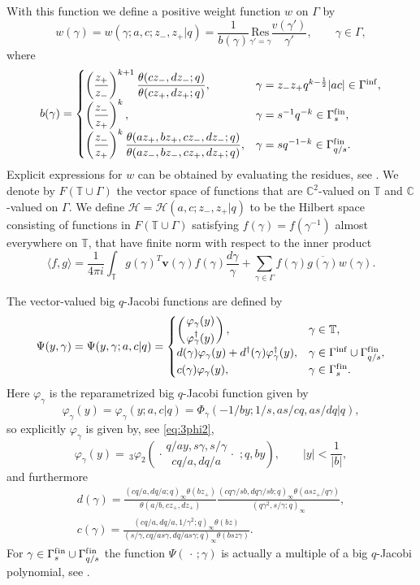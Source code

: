\documentclass[pdftex]{sigma}
\numberwithin{equation}{section}
\numberwithin{theorem}{section}
\numberwithin{proposition}{section}
\numberwithin{lemma}{section}
\numberwithin{corollary}{section}
\numberwithin{definition}{section}
\numberwithin{example}{section}
\numberwithin{remark}{section}
\numberwithin{note}{section}
\newcommand{\C}{\mathbb C}
\newcommand{\T}{\mathbb T}
\newcommand{\rphis}[5]{\,_{#1}\varphi_{#2} \left( \genfrac{.}{.}{0pt}{}{#3}{#4}
\ ;#5 \right)}
\newcommand{\Res}[1]{\underset{#1}{\mathrm{Res}}}
\newcommand{\vect}[2]{\left( \genfrac{.}{.}{0pt}{}{#1}{#2} \right) }
\begin{document}
With this function we def\/ine a positive weight function $w$ on $\Gamma$ by
\[
w(\gamma)=w(\gamma;a,c;z_-,z_+|q) = \frac1{b(\gamma)}\Res{\gamma'=\gamma} \frac{v(\gamma')}{\gamma'},\qquad \gamma \in \Gamma,
\]
where
\[
b(\gamma)=
\begin{cases}
\left(\dfrac{z_+}{z_-}\right)^{k+1}\dfrac{\theta(cz_-,dz_-;q)}{\theta(cz_+,dz_+;q)}, &\gamma =z_-z_+q^{k-\frac12}|ac| \in \Gamma^{\mathrm{inf}},\\
\left(\dfrac{z_-}{z_+}\right)^k ,& \gamma = s^{-1}q^{-k} \in \Gamma^{\mathrm{f\/in}}_s,\\
\left( \dfrac{z_-}{z_+} \right)^k \dfrac{ \theta(az_+, bz_+, cz_-, dz_-;q) }{ \theta(az_-, bz_-, cz_+, dz_+;q) }, &\gamma = sq^{-1-k} \in \Gamma^{\mathrm{f\/in}}_{q/s}.
\end{cases}
\]
Explicit expressions for $w$ can be obtained by evaluating the residues, see \cite[Section~4]{Gr09}.
We denote by $F(\T\cup \Gamma)$ the vector space of functions that are $\C^2$-valued on $\T$ and $\C$-valued on $\Gamma$. We def\/ine $\mathcal H=\mathcal H(a,c;z_-,z_+|q)$ to be the Hilbert space consisting of functions in $F(\T\cup\Gamma)$ satisfying $f(\gamma)=f(\gamma^{-1})$ almost everywhere on $\T$, that have f\/inite norm with respect to the inner product
\[
\langle f,g \rangle = \frac{ 1}{4\pi i } \int_\T g(\gamma)^T
\mathbf v(\gamma) f(\gamma) \frac{ d\gamma}{\gamma} + \sum_{\gamma \in \Gamma}  f(\gamma) \overline{g(\gamma)} w(\gamma).
\]

The vector-valued big $q$-Jacobi functions are def\/ined by
\begin{gather*} %
\Psi(y,\gamma) = \Psi(y,\gamma;a,c|q)=
\begin{cases}
\displaystyle \vect{\varphi_\gamma(y)}{\varphi_\gamma^\dagger(y)}, & \gamma \in \T,\\
d(\gamma) \varphi_\gamma(y)+d^\dagger(\gamma) \varphi_\gamma^\dagger(y), & \gamma \in \Gamma^{\mathrm{inf}} \cup \Gamma^{\mathrm{f\/in}}_{q/s},\\
c(\gamma) \varphi_\gamma(y), & \gamma \in \Gamma_s^{\mathrm{f\/in}}.
\end{cases}
\end{gather*}
Here $\varphi_\gamma$ is the reparametrized big $q$-Jacobi function given by
\[
\varphi_\gamma(y) = \varphi_\gamma(y;a,c|q) = \Phi_\gamma(-1/by; 1/s, as/cq, as/dq|q),
\]
so explicitly $\varphi_\gamma$ is given by, see \eqref{eq:3phi2},
\[
\varphi_\gamma(y) = \rphis{3}{2}{q/ay, s\gamma, s/\gamma}{cq/a, dq/a}{q,by}, \qquad |y| <  \frac{1}{|b|},
\]
and furthermore
\begin{gather*}
d(\gamma) = \frac{  (cq/a, dq/a;q)_\infty \theta(bz_+) }{  \theta(a/b,cz_+,dz_+) }   \frac{ (cq\gamma/sb, dq\gamma/sb;q)_\infty \theta(asz_+/q\gamma) }{ (q\gamma^2,s/\gamma;q)_\infty},\\
c(\gamma) = \frac{ (cq/a, dq/a, 1/\gamma^2;q)_\infty \theta(bz) }{ (s/\gamma, cq/as\gamma, dq/as\gamma;q)_\infty \theta( bsz\gamma ) }.
\end{gather*}
For $\gamma \in \Gamma^{\mathrm{f\/in}}_s \cup \Gamma^{\mathrm{f\/in}}_{q/s}$ the function $\Psi(\,\cdot\,;\gamma)$ is actually a multiple of a big $q$-Jacobi polynomial, see \cite[Lemma 3.9]{Gr09}.
\end{document}
